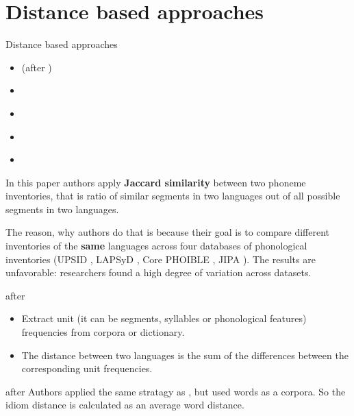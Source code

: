 \documentclass[
  ignorenonframetext,
]{beamer}
\providecommand{\tightlist}{%
  \setlength{\itemsep}{0pt}\setlength{\parskip}{0pt}}
\begin{document}
\hypertarget{distance-based-approaches}{%
\section{Distance based approaches}\label{distance-based-approaches}}

\begin{frame}{Distance based approaches}
\protect\hypertarget{distance-based-approaches-1}{}
\begin{itemize}
\tightlist
\item
  \citep{hoppenbrouwers01} (after \citep{heeringa04})
\item
  \citep{nerbonne01}
\item
  \citep{heeringa04}
\item
  \citep{eden18}
\item
  \citep{anderson21}
\end{itemize}
\end{frame}

\begin{frame}{\citep{anderson21}}
\protect\hypertarget{anderson21}{}
In this paper authors apply \textbf{Jaccard similarity} between two
phoneme inventories, that is ratio of similar segments in two languages
out of all possible segments in two languages. \pause

The reason, why authors do that is because their goal is to compare
different inventories of the \textbf{same} languages across four
databases of phonological inventories (UPSID \citep{maddieson87}, LAPSyD
\citep{maddieson13}, Core PHOIBLE \citep{phoible19}, JIPA
\citep{baird21}). The results are unfavorable: researchers found a high
degree of variation across datasets.
\end{frame}

\begin{frame}{\citep{hoppenbrouwers01} after \citep{heeringa04}}
\protect\hypertarget{hoppenbrouwers01-after-heeringa04}{}
\begin{itemize}
\tightlist
\item
  Extract unit (it can be segments, syllables or phonological features)
  frequencies from corpora or dictionary.
\item
  The distance between two languages is the sum of the differences
  between the corresponding unit frequencies.
\end{itemize}
\end{frame}

\begin{frame}{\citep{nerbonne01} after \citep{heeringa04}}
\protect\hypertarget{nerbonne01-after-heeringa04}{}
Authors applied the same stratagy as \citep{hoppenbrouwers01}, but used
words as a corpora. So the idiom distance is calculated as an average
word distance.
\end{frame}
\end{document}
